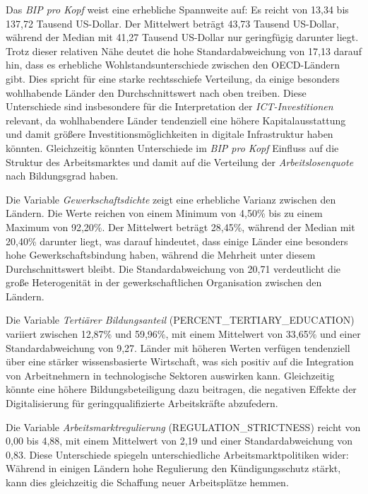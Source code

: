 Das \textit{\ac{BIP} pro Kopf} weist eine erhebliche Spannweite auf: Es reicht von 13,34 bis 
137,72 Tausend US-Dollar. Der Mittelwert beträgt 43,73 Tausend US-Dollar, während der Median mit 
41,27 Tausend US-Dollar nur geringfügig darunter liegt. Trotz dieser relativen Nähe deutet die 
hohe Standardabweichung von 17,13 darauf hin, dass es erhebliche Wohlstandsunterschiede zwischen 
den \ac{OECD}-Ländern gibt. Dies spricht für eine starke rechtsschiefe Verteilung, da einige 
besonders wohlhabende Länder den Durchschnittswert nach oben treiben. Diese Unterschiede sind 
insbesondere für die Interpretation der \textit{\ac{ICT}-Investitionen} relevant, da 
wohlhabendere Länder tendenziell eine höhere Kapitalausstattung und damit größere 
Investitionsmöglichkeiten in digitale Infrastruktur haben könnten. Gleichzeitig könnten 
Unterschiede im \textit{\ac{BIP} pro Kopf} Einfluss auf die Struktur des Arbeitsmarktes und 
damit auf die Verteilung der \textit{Arbeitslosenquote} nach Bildungsgrad haben. 

Die Variable \textit{Gewerkschaftsdichte} zeigt eine erhebliche Varianz zwischen den Ländern. Die 
Werte reichen von einem Minimum von 4,50\% bis zu einem Maximum von 92,20\%. Der Mittelwert 
beträgt 28,45\%, während der Median mit 20,40\% darunter liegt, was darauf hindeutet, dass einige 
Länder eine besonders hohe Gewerkschaftsbindung haben, während die Mehrheit unter diesem 
Durchschnittswert bleibt. Die Standardabweichung von 20,71 verdeutlicht die große Heterogenität 
in der gewerkschaftlichen Organisation zwischen den Ländern. 

Die Variable \textit{Tertiärer Bildungsanteil} (PERCENT\_TERTIARY\_EDUCATION) variiert zwischen 
12,87\% und 59,96\%, mit einem Mittelwert von 33,65\% und einer Standardabweichung von 9,27. 
Länder mit höheren Werten verfügen tendenziell über eine stärker wissensbasierte Wirtschaft, was 
sich positiv auf die Integration von Arbeitnehmern in technologische Sektoren auswirken kann. 
Gleichzeitig könnte eine höhere Bildungsbeteiligung dazu beitragen, die negativen Effekte der 
Digitalisierung für geringqualifizierte Arbeitskräfte abzufedern. 

Die Variable \textit{Arbeitsmarktregulierung} (REGULATION\_STRICTNESS) reicht von 0,00 bis 4,88, 
mit einem Mittelwert von 2,19 und einer Standardabweichung von 0,83. Diese Unterschiede spiegeln 
unterschiedliche Arbeitsmarktpolitiken wider: Während in einigen Ländern hohe Regulierung den 
Kündigungsschutz stärkt, kann dies gleichzeitig die Schaffung neuer Arbeitsplätze hemmen. 

